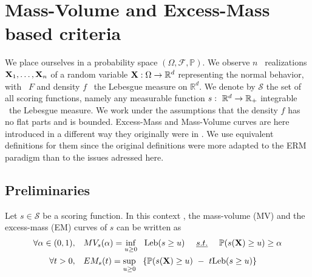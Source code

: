 \section{Mass-Volume and Excess-Mass based criteria}
\label{evaluation:background}
We place ourselves in a probability space $(\Omega, \mathcal{F}, \mathbb{P})$. We observe $n$ \iid~realizations $\mathbf X_1,\ldots,\mathbf X_n$ of a random variable $\mathbf X:\Omega \to \mathbb{R}^d$ representing the normal behavior, with \cdf~$F$ and density $f$ \wrt~the Lebesgue measure on $\mathbb{R}^d$. We denote by $\mathcal{S}$ the set of all scoring functions, namely any measurable function $s:~\mathbb{R}^d \to \mathbb{R}_+$ integrable \wrt~the Lebesgue measure.
We work under the assumptions that the density $f$ %
has no flat parts and is bounded. Excess-Mass and Mass-Volume curves are here introduced in a different way they originally were in \cite{CLEM13, AISTAT15}. We use equivalent definitions for them since %
the original definitions were more adapted to the ERM paradigm than to the issues adressed here.

\subsection{Preliminaries}
Let $s\in \mathcal{S}$ be a scoring function. In this context \cite{CLEM13,AISTAT15}, the mass-volume (MV) and the excess-mass (EM) curves of $s$ can be written as
\begin{align}
\label{evaluation:MV-def}
\forall \alpha\in (0,1),~~~& MV_s(\alpha) = \inf_{u \ge 0}~~ \text{Leb}(s \ge u) ~~~~\emph{s.t.}{}~~~~ \mathbb{P}(s(\mathbf X) \ge u) \ge \alpha\\
\label{evaluation:EM-def}
\forall t >0,~~~ & EM_s(t) = \sup_{u \ge 0}~~\left\{ \mathbb{P}(s(\mathbf X) \ge u) ~-~ t \text{Leb}(s \ge u) \right\}
\end{align}

